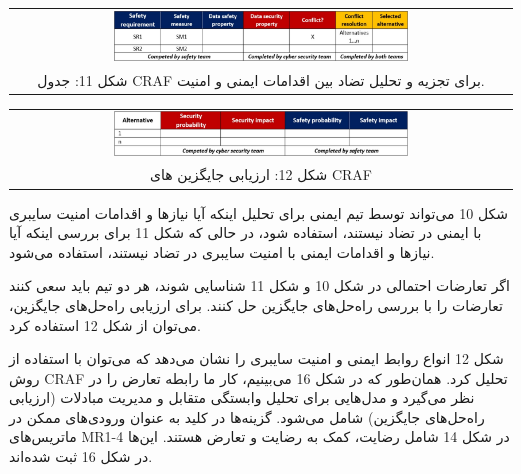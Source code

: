 \documentclass[a4paper,10pt]{article}
\begin{document}
                \begin{table}
            
                    \centering
                    \begin{tabular}{ c }
                        
                        \includegraphics[width=0.6\textwidth]{Image/fig11.jpg} \\
        
                        شکل 11: جدول CRAF برای تجزیه و تحلیل تضاد بین اقدامات ایمنی و امنیت.
        
                    \end{tabular}
        
                \end{table}

                \begin{table}
            
                    \centering
                    \begin{tabular}{ c }
                        
                        \includegraphics[width=0.6\textwidth]{Image/fig12.jpg} \\
        
                        شکل 12: ارزیابی جایگزین های CRAF
        
                    \end{tabular}
        
                \end{table}

                شکل 10 می‌تواند توسط تیم ایمنی برای تحلیل اینکه آیا نیازها و اقدامات امنیت سایبری با ایمنی در تضاد نیستند، استفاده شود، در حالی که شکل 11 برای بررسی اینکه آیا نیازها و اقدامات ایمنی با امنیت سایبری در تضاد نیستند، استفاده می‌شود.

                اگر تعارضات احتمالی در شکل 10 و شکل 11 شناسایی شوند، هر دو تیم باید سعی کنند تعارضات را با بررسی راه‌حل‌های جایگزین حل کنند. برای ارزیابی راه‌حل‌های جایگزین، می‌توان از شکل 12 استفاده کرد.

                شکل 12 انواع روابط ایمنی و امنیت سایبری را نشان می‌دهد که می‌توان با استفاده از روش CRAF تحلیل کرد. همان‌طور که در شکل 16 می‌بینیم، کار ما رابطه تعارض را در نظر می‌گیرد و مدل‌هایی برای تحلیل وابستگی متقابل و مدیریت مبادلات (ارزیابی راه‌حل‌های جایگزین) شامل می‌شود. گزینه‌ها در کلید به عنوان ورودی‌های ممکن در ماتریس‌های MR1-4 در شکل 14 شامل رضایت، کمک به رضایت و تعارض هستند. این‌ها در شکل 16 ثبت شده‌اند.
\end{document}
